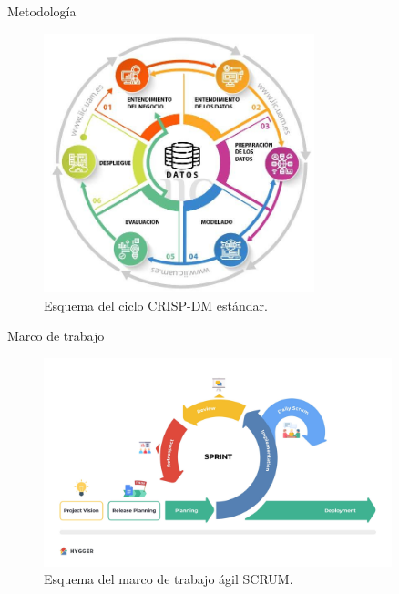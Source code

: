 \begin{frame}{Metodología}
	
    \begin{figure}[H]
    \centering
    \includegraphics[width=0.7\textwidth]{../Memoria/img/metodologia/crispdm.jpeg}
    \caption{Esquema del ciclo CRISP-DM estándar.}
    \label{fig:CRISP-DM}
\end{figure}
    
\end{frame}

\begin{frame}{Marco de trabajo}
    \begin{figure}[H]
    \centering
    \includegraphics[width=0.9\textwidth]{../Memoria/img/metodologia/scrum.jpg}
    \caption{Esquema del marco de trabajo ágil SCRUM.}
    \label{fig:SCRUM}
\end{figure}
    
\end{frame}

